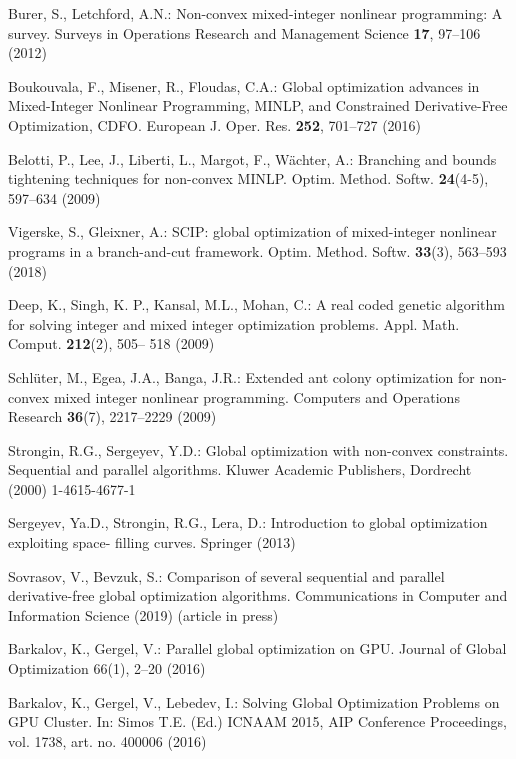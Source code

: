 \documentclass{llncs}
\begin{document}
\begin{thebibliography}{10}

Burer, S., Letchford, A.N.: Non-convex mixed-integer nonlinear programming: A survey. 
Surveys in Operations Research and Management Science \textbf{17}, 97--106 (2012) 

Boukouvala, F., Misener, R., Floudas, C.A.: Global optimization advances in Mixed-Integer 
Nonlinear Programming, MINLP, and Constrained Derivative-Free Optimization, CDFO. 
European J. Oper. Res. \textbf{252}, 701--727 (2016) 

Belotti, P., Lee, J., Liberti, L., Margot, F., W\"achter, A.: Branching and bounds tightening 
techniques for non-convex MINLP. Optim. Method. Softw. \textbf{24}(4-5), 597--634 (2009)

Vigerske, S., Gleixner, A.: SCIP: global optimization of mixed-integer nonlinear programs in a 
branch-and-cut framework. 
Optim. Method. Softw. \textbf{33}(3), 563--593 (2018)

Deep, K., Singh, K. P., Kansal, M.L., Mohan, C.: A real coded genetic algorithm for solving 
integer and mixed integer optimization problems. Appl. Math. Comput. \textbf{212}(2), 505--
518 (2009)

Schl\"uter, M., Egea, J.A., Banga, J.R.: Extended ant colony optimization for non-convex 
mixed integer nonlinear programming. Computers and Operations Research \textbf{36}(7), 
2217--2229 (2009)

Strongin, R.G., Sergeyev, Y.D.: Global optimization with non-convex constraints. Sequential 
and parallel algorithms. Kluwer Academic Publishers, Dordrecht (2000) %
1-4615-4677-1

Sergeyev, Ya.D., Strongin, R.G., Lera, D.: Introduction to global optimization exploiting space-
filling curves. Springer (2013) %

Sovrasov, V., Bevzuk, S.: Comparison of several sequential and parallel derivative-free global optimization algorithms. 	Communications in Computer and Information Science (2019) (article in press)

Barkalov, K., Gergel, V.: Parallel global optimization on GPU. Journal of Global Optimization 
66(1), 2--20 (2016) 

Barkalov, K., Gergel, V., Lebedev, I.: Solving Global Optimization Problems on GPU Cluster. 
In: Simos T.E. (Ed.) ICNAAM 2015, AIP Conference Proceedings, vol. 1738, art. no. 400006 
(2016)


\end{thebibliography}
\end{document}
